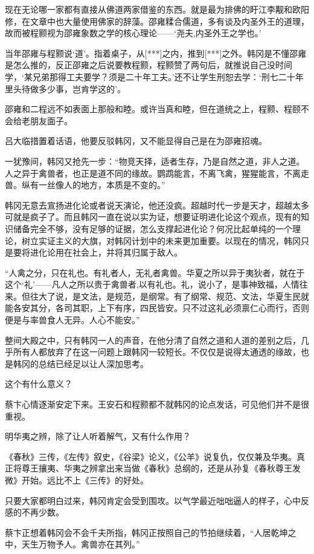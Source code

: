 现在无论哪一家都有直接从佛道两家借鉴的东西。就是最为排佛的盱江李觏和欧阳修，在文章中也大量使用佛家的辞藻。邵雍糅合儒道，多有谈及内圣外王的道理，故而被程颢视为邵雍象数之学的核心理论——‘尧夫,内圣外王之学也。’

当年邵雍与程颢说‘道’。指着桌子，从[***]之内，推到[***]之外。韩冈是不懂邵雍是怎么推的，反正邵雍之后说要教程颢，程颢赞了两句后，就推说自己没时间学，‘某兄弟那得工夫要学？须是二十年工夫。’还不让学生刑恕去学：‘刑七二十年里头待做多少事，岂肯学这的’。

邵雍和二程远不如表面上那般和睦。或许当真和睦，但在道统之上，程颢、程颐不会给老朋友面子。

吕大临措置着话语，他要反驳韩冈，又不能显得自己是在为邵雍招魂。

一犹豫间，韩冈又抢先一步：“物竞天择，适者生存，乃是自然之道，非人之道。人之异于禽兽者，也正是道不同的缘故。鹦鹉能言，不离飞禽，猩猩能言，不离走兽。纵有一丝像人的地方，本质是不变的。”

韩冈无意去宣扬进化论或者说天演论，他还没疯。超越时代一步是天才，超越太多可就是疯子了。而且韩冈一直在说以实为证，想要证明进化论这个观点，现有的知识储备完全不够，没有足够的证据，怎么支撑起进化论？何况比起单纯的一个理论，树立实证主义的大旗，对韩冈计划中的未来更加重要。以现在的情况，韩冈只是要将进化论用在社会上，并将其归属于敌人。

“人禽之分，只在礼也。有礼者人，无礼者禽兽。华夏之所以异于夷狄者，就在于这个‘礼’——凡人之所以贵于禽兽者,以有礼也。礼，说小了，是事神致福，人情往来。但往大了说，是文法，是规范，是纲常。有了纲常、规范、文法，华夏生民就能各安其分，各司其职，上下有序，四民皆安。只不过这礼必须禀仁心而行，否则便是与率兽食人无异。人心不能安。”

整间大殿之中，只有韩冈一人的声音，在他分清了自然之道和人道的差别之后，几乎所有人都放弃了在这一问题上跟韩冈一较短长。不仅仅是说得太通透的缘故，也是韩冈的总结已经足以让人深加思考。

这个有什么意义？

蔡卞心情逐渐安定下来。王安石和程颢都不就韩冈的论点发话，可见他们并不是很重视。

明华夷之辨，除了让人听着解气，又有什么作用？

《春秋》三传，《左传》叙史，《谷梁》论义，《公羊》说复仇，仅仅兼及华夷。真正将尊王攘夷、华夷之辨拿出来当做《春秋》总纲的，还是从孙复《春秋尊王发微》开始。远比不上《三传》的好处。

只要大家都明白过来，韩冈肯定会受到围攻。以气学最近咄咄逼人的样子，心中反感的不再少数。

蔡卞正想着韩冈会不会千夫所指，韩冈正按照自己的节拍继续着，“人居乾坤之中，天生万物予人。禽兽亦在其列。”
